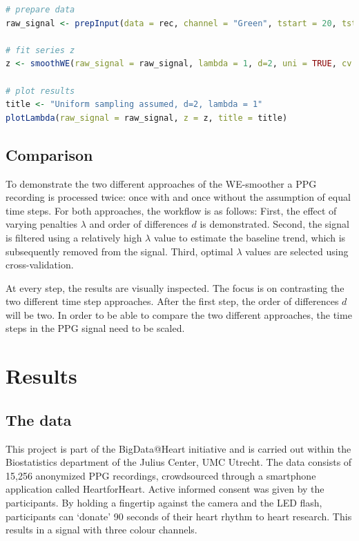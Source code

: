 \documentclass[twocolumn]{bmcart}%
\begin{document}
\begin{lstlisting}[language=R, caption = Using PPGtools, label=lst]
# prepare data
raw_signal <- prepInput(data = rec, channel = "Green", tstart = 20, tstop = 40)

# fit series z
z <- smoothWE(raw_signal = raw_signal, lambda = 1, d=2, uni = TRUE, cv = FALSE)

# plot results
title <- "Uniform sampling assumed, d=2, lambda = 1"
plotLambda(raw_signal = raw_signal, z = z, title = title)
\end{lstlisting}

\subsection*{Comparison}
To demonstrate the two different approaches of the WE-smoother a PPG recording is processed twice: once with and once without the assumption of equal time steps. 
For both approaches, the workflow is as follows:
First, the effect of varying penalties $\lambda$ and order of differences $d$ is demonstrated. 
Second, the signal is filtered using a relatively high $\lambda$ value to estimate the baseline trend, which is subsequently removed from the signal. 
Third, optimal $\lambda$ values are selected using cross-validation.

At every step, the results are visually inspected.
The focus is on contrasting the two different time step approaches.
After the first step, the order of differences $d$ will be two.
In order to be able to compare the two different approaches, the time steps in the PPG signal need to be scaled. 

\section*{Results}
\subsection*{The data}
This project is part of the BigData@Heart initiative and is carried out within the Biostatistics department of the Julius Center, UMC Utrecht. 
The data consists of 15,256 anonymized PPG recordings, crowdsourced through a smartphone application called HeartforHeart. 
Active informed consent was given by the participants. 
By holding a fingertip against the camera and the LED flash, participants can ‘donate’ 90 seconds of their heart rhythm to heart research. 
This results in a signal with three colour channels. 
\end{document}

